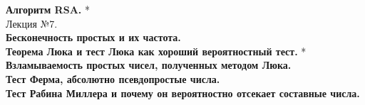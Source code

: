\documentclass[12pt]{article}
\begin{document}
\textbf{Алгоритм RSA.} *\\

Лекция №7.\\
\textbf{Бесконечность простых и их частота.}\\

\textbf{Теорема Люка и тест Люка как хороший вероятностный тест.} *\\

\textbf{Взламываемость простых чисел, полученных методом Люка.}\\

\textbf{Тест Ферма, абсолютно псевдопростые числа.}\\

\textbf{Тест Рабина Миллера и почему он вероятностно отсекает составные числа.}\\
\end{document}
